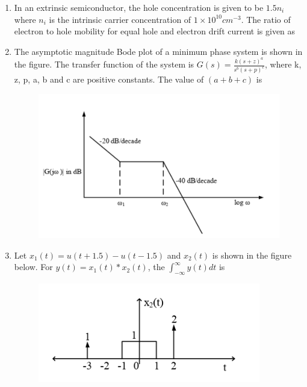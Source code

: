 \documentclass[a4paper, 11pt]{article}
\begin{document}
\begin{enumerate}
    \hfill{}
    
    \item In an extrinsic semiconductor, the hole concentration is given to be $1.5n_i$ where $n_i$ is the intrinsic carrier concentration of $1 \times 10^{10} cm^{-3}$. The ratio of electron to hole mobility for equal hole and electron drift current is given as \underline{\hspace{2cm}} 
    
    \hfill{}
    
    \item The asymptotic magnitude Bode plot of a minimum phase system is shown in the figure. The transfer function of the system is $G(s) = \frac{k(s+z)^a}{s^b(s+p)^c}$, where k, z, p, a, b and c are positive constants. The value of $(a+b+c)$ is \underline{\hspace{2cm}} 
    \begin{figure}[H]
        \centering
        \includegraphics[width=0.6\columnwidth]{figs/Q47.png}
        \caption*{}
        \label{fig:q57}
    \end{figure}
    
    \hfill{}
    
    \item Let $x_1(t) = u(t+1.5) - u(t-1.5)$ and $x_2(t)$ is shown in the figure below. For $y(t) = x_1(t) * x_2(t)$, the $\int_{-\infty}^{\infty} y(t) dt$ is \underline{\hspace{2cm}} 
    \begin{figure}[H]
        \centering
        \includegraphics[width=0.4\columnwidth]{figs/Q48.png}
        \caption*{}
        \label{fig:q58}
    \end{figure}
    

\end{enumerate}
\end{document}
